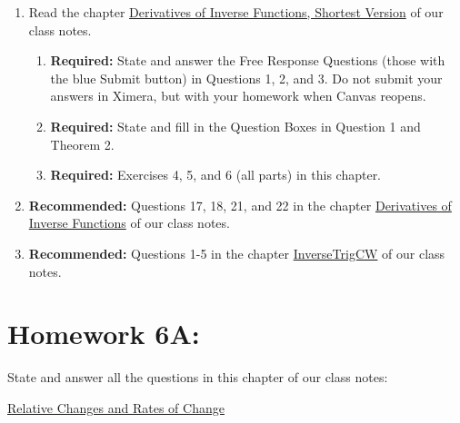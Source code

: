 \documentclass{ximera}
\begin{document}
\begin{enumerate}
\item Read the chapter \href{https://ximera.osu.edu/calcone/Calculus1/InverseShortest/InverseShortest}{Derivatives of Inverse Functions, Shortest Version} of our class notes. 

\begin{enumerate}
\item {\bf Required:} State and answer the Free Response Questions (those with the blue Submit button) in Questions 1, 2, and 3. Do not submit your answers in Ximera, but with your homework when Canvas reopens.

\item {\bf Required:} State and fill in the Question Boxes in Question 1 and Theorem 2.

\item {\bf Required:} Exercises 4, 5, and 6 (all parts) in this chapter.
\end{enumerate}

\item {\bf Recommended:} Questions 17, 18, 21, and 22 in the chapter \href{https://ximera.osu.edu/calcone/Calculus1/InverseF/InverseF}{Derivatives of Inverse Functions} of our class notes.

\item {\bf Recommended:} Questions 1-5 in the chapter \href{https://ximera.osu.edu/calcone/Calculus1/InverseTrigCW/InverseTrigCW}{InverseTrigCW} of our class notes. 

\end{enumerate}

\section{Homework 6A:} State and answer all the questions in this chapter of our class notes:

\href{https://ximera.osu.edu/calcone/Calculus1/RelativeChanges/RelativeChanges}{Relative Changes and Rates of Change}
\end{document}
